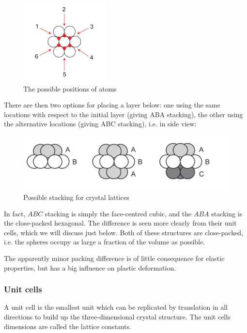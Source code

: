 \documentclass{article}
\begin{document}
\begin{figure}[h]
    \centering
    \includegraphics{images/mat2.png}
    \caption{The possible positions of atoms}
    \label{fig:enter-label}
\end{figure}

There are then two options for placing a layer
below: one using the same locations with respect to the initial layer
(giving ABA stacking), the other using the alternative locations
(giving ABC stacking), i.e. in side view:

\begin{figure}[h]
    \centering
    \includegraphics{images/mat3.png}
    \caption{Possible stacking for crystal lattices}
    \label{fig:enter-label}
\end{figure}

In fact, $ABC$ stacking is simply the face-centred cubic, and the $ABA$ stacking is the close-packed hexagonal. The difference is seen more clearly from their unit cells, which we will discuss just below. Both of these structures are close-packed, i.e. the spheres occupy as large a fraction of the volume as possible.

The apparently minor packing difference is of little consequence for elastic properties, but has a big influence on plastic deformation.

\subsubsection{Unit cells}

\begin{definition}
    A unit cell is the smallest unit which can be replicated by translation in all directions to build up the three-dimensional crystal structure. The unit cells dimensions are called the lattice constants.
\end{definition}
\end{document}
